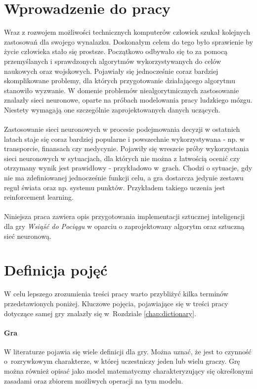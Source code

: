 \documentclass[12pt, oneside]{report}
\begin{document}
\section{Wprowadzenie do pracy}
Wraz z rozwojem możliwości technicznych komputerów człowiek szukał kolejnych zastosowań dla swojego wynalazku. Doskonałym celem do tego było sprawienie by życie człowieka stało się prostsze. Początkowo odbywało się to za pomocą przemyślanych i sprawdzonych algorytmów wykorzystywanych do celów naukowych oraz wojskowych. Pojawiały się jednocześnie coraz bardziej skomplikowane problemy, dla których przygotowanie działającego algorytmu stanowiło wyzwanie. 
W domenie problemów niealgorytmicznych zastosowanie znalazły sieci neuronowe, oparte na próbach modelowania pracy ludzkiego mózgu. Niestety wymagają one szczególnie zaprojektowanych danych uczących.
\\ \\
Zastosowanie sieci neuronowych w procesie podejmowania decyzji w ostatnich latach staje się coraz bardziej popularne i powszechnie wykorzystywana - np. w transporcie, finansach czy medycynie. Pojawiły się wreszcie próby wykorzystania sieci neuronowych w sytuacjach, dla których nie można z łatwością ocenić czy otrzymany wynik jest prawidłowy - przykładowo w~grach. Chodzi o sytuacje, gdy nie ma zdefiniowanej jednocześnie funkcji celu, a gra dostarcza jedynie zestawu reguł świata oraz np. systemu punktów. Przykładem takiego uczenia jest reinforcement learning.   \\ \\ 
Niniejsza praca zawiera opis przygotowania implementacji sztucznej inteligencji dla gry \textit{Wsiąść do Pociągu} w oparciu o zaprojektowany algorytm oraz sztuczną sieć neuronową. 
\section{Definicja pojęć}
\label{section:Definitions}
W celu lepszego zrozumienia treści pracy warto przybliżyć kilka terminów przedstawionych poniżej. Kluczowe pojęcia, pojawiające się w treści pracy dotyczące samej gry znalazły się w~Rozdziale \ref{chap:dictionary}.
\paragraph{Gra} W literaturze pojawia się wiele definicji dla gry. Można uznać, że jest to czynność o~rozrywkowym charakterze, w której uczestniczy jeden lub wielu graczy. Grę można również opisać jako model matematyczny charakteryzujący się określonymi zasadami oraz zbiorem możliwych operacji na tym modelu.
\end{document}

